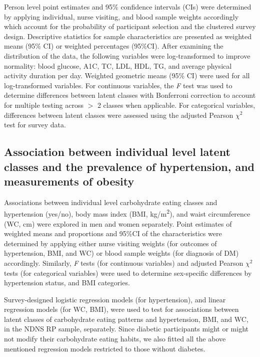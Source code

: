Person level point estimates and 95\% confidence intervals (CIs) were determined by applying individual, nurse visiting, and blood sample weights accordingly which account for the probability of participant selection and the clustered survey design. Descriptive statistics for sample characteristics are presented as weighted means (95\% CI) or weighted percentages (95\%CI). After examining the distribution of the data, the following variables were log-transformed to improve normality: blood glucose, A1C, TC, LDL, HDL, TG, and average physical activity duration per day. Weighted geometric means (95\% CI) were used for all log-transformed variables. For continuous variables, the \textit{F} test was used to determine differences between latent classes with Bonferroni correction to account for multiple testing across $>$ 2 classes when applicable. For categorical variables, differences between latent classes were assessed using the adjusted Pearson $\chi^2$ test for survey data.\vspace{-0.5cm}


\subsection{Association between individual level latent classes and the prevalence of hypertension, and measurements of obesity}\vspace{-0.3cm}


Associations between individual level carbohydrate eating classes and hypertension (yes/no), body mass index (BMI, kg/m\textsuperscript{2}), and waist circumference (WC, cm) were explored in men and women separately. Point estimates of weighted means and proportions and 95\%CI of the characteristics were determined by applying either nurse visiting weights (for outcomes of hypertension, BMI, and WC) or blood sample weights (for diagnosis of DM) accordingly. Similarly, \textit{F} tests (for continuous variables) and adjusted Pearson $\chi^2$ tests (for categorical variables) were used to determine sex-specific differences by hypertension status, and BMI categories. 



Survey-designed logistic regression models (for hypertension), and linear regression models (for WC, BMI), were used to test for associations between latent classes of carbohydrate eating patterns and hypertension, BMI, and WC, in the NDNS RP sample, separately. Since diabetic participants might or might not modify their carbohydrate eating habits, we also fitted all the above mentioned regression models restricted to those without diabetes.

